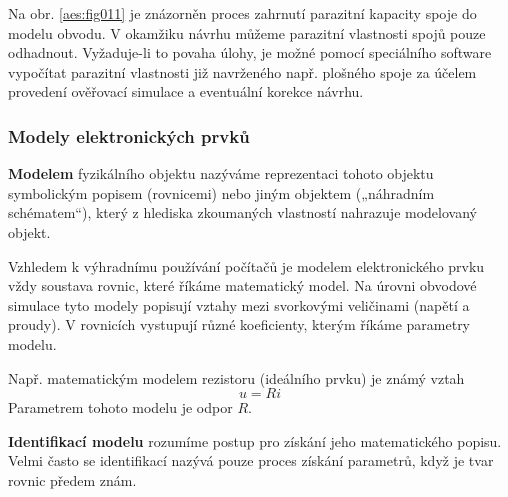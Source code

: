 
          Na obr. \ref{aes:fig011} je znázorněn proces zahrnutí parazitní kapacity spoje do modelu
          obvodu. V okamžiku návrhu můžeme parazitní vlastnosti spojů pouze odhadnout. Vyžaduje-li
          to povaha úlohy, je možné pomocí speciálního software vypočítat parazitní vlastnosti již
          navrženého např. plošného spoje za účelem provedení ověřovací simulace a eventuální
          korekce návrhu.

        \subsubsection{Modely elektronických prvků}
          \textbf{Modelem} fyzikálního objektu nazýváme reprezentaci tohoto objektu symbolickým
          popisem (rovnicemi) nebo jiným objektem („náhradním schématem“), který z hlediska zkoumaných
          vlastností nahrazuje modelovaný objekt.

          Vzhledem k výhradnímu používání počítačů je modelem elektronického prvku vždy soustava
          rovnic, které říkáme matematický model. Na úrovni obvodové simulace tyto modely popisují
          vztahy mezi svorkovými veličinami (napětí a proudy). V rovnicích vystupují různé
          koeficienty, kterým říkáme parametry modelu.

          Např. matematickým modelem rezistoru (ideálního prvku) je známý vztah
          \begin{equation*}
            u = Ri
          \end{equation*}
          Parametrem tohoto modelu je odpor \(R\).

          \textbf{Identifikací modelu} rozumíme postup pro získání jeho matematického popisu. Velmi
          často se identifikací nazývá pouze proces získání parametrů, když je tvar rovnic předem
          znám.

